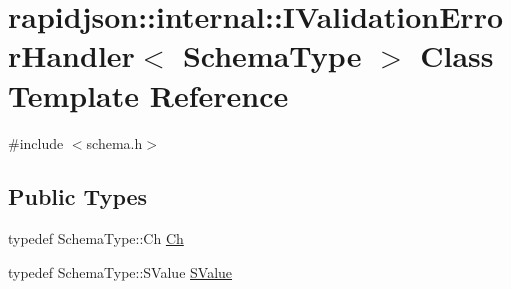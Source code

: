 \hypertarget{classrapidjson_1_1internal_1_1_i_validation_error_handler}{}\section{rapidjson\+::internal\+::I\+Validation\+Error\+Handler$<$ Schema\+Type $>$ Class Template Reference}
\label{classrapidjson_1_1internal_1_1_i_validation_error_handler}


{\ttfamily \#include $<$schema.\+h$>$}

\subsection*{Public Types}
\begin{DoxyCompactItemize}
\item 
typedef Schema\+Type\+::\+Ch \mbox{\hyperlink{classrapidjson_1_1internal_1_1_i_validation_error_handler_a02c672a313401138fd08504062f3d1d0}{Ch}}
\item 
typedef Schema\+Type\+::\+S\+Value \mbox{\hyperlink{classrapidjson_1_1internal_1_1_i_validation_error_handler_a8a2aaf7eb28a3ce7ed81689141f3af1f}{S\+Value}}
\end{DoxyCompactItemize}
